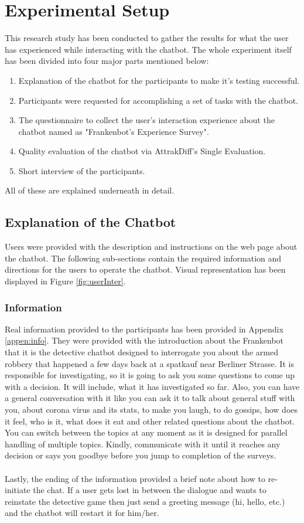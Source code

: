 \section{Experimental Setup}
This research study has been conducted to gather the results for what the user has experienced while interacting with the chatbot. The whole experiment itself has been divided into four major parts mentioned below:
\begin{enumerate}
    \item Explanation of the chatbot for the participants to make it's testing successful.
    \item Participants were requested for accomplishing a set of tasks with the chatbot.
    \item The questionnaire to collect the user's interaction experience about the chatbot named as "Frankenbot's Experience Survey".
    \item Quality evaluation of the chatbot via AttrakDiff's Single Evaluation.
    \item Short interview of the participants.
\end{enumerate} 
All of these are explained underneath in detail.

\subsection{Explanation of the Chatbot}
Users were provided with the description and instructions on the web page about the chatbot. The following sub-sections contain the required information and directions for the users to operate the chatbot. Visual representation has been displayed in Figure \ref{fig:userInter}.

\subsubsection*{Information}
Real information provided to the participants has been provided in Appendix \ref{appen:info}. They were provided with the introduction about the Frankenbot that it is the detective chatbot designed to interrogate you about the armed robbery that happened a few days back at a spatkauf near Berliner Strasse. It is responsible for investigating, so it is going to ask you some questions to come up with a decision. It will include, what it has investigated so far. Also, you can have a general conversation with it like you can ask it to talk about general stuff with you, about corona virus and its stats, to make you laugh, to do gossips, how does it feel, who is it, what does it eat and other related questions about the chatbot. You can switch between the topics at any moment as it is designed for parallel handling of multiple topics. Kindly, communicate with it until it reaches any decision or says you goodbye before you jump to completion of the surveys.
\\~\\
Lastly, the ending of the information provided a brief note about how to re-initiate the chat. If a user gets lost in between the dialogue and wants to reinstate the detective game then just send a greeting message (hi, hello, etc.) and the chatbot will restart it for him/her. 

